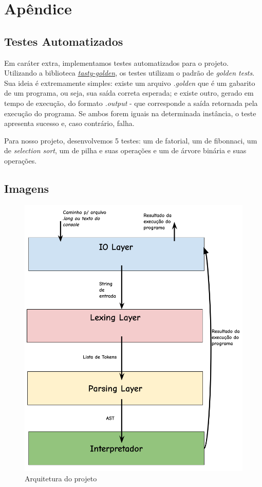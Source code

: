 \documentclass{article}
\begin{document}
\section{Apêndice}
\subsection{Testes Automatizados}
Em caráter extra, implementamos testes automatizados para o projeto. Utilizando a biblioteca \href{https://hackage.haskell.org/package/tasty-golden}{\textit{tasty-golden}}, os testes utilizam o padrão de \textit{golden tests}. Sua ideia é extremamente simples: existe um arquivo \textit{.golden} que é um gabarito de um programa, ou seja, sua saída correta esperada; e existe outro, gerado em tempo de execução, do formato \textit{.output} - que corresponde a saída retornada pela execução do programa. Se ambos forem iguais na determinada instância, o teste apresenta sucesso e, caso contrário, falha.

Para nosso projeto, desenvolvemos 5 testes: um de fatorial, um de fibonnaci, um de \textit{selection sort}, um de pilha e suas operações e um de árvore binária e suas operações.

\subsection{Imagens}
\begin{figure}[h]
\centering
\includegraphics[width=13cm]{architecture-compiladores.png}
\caption{Arquitetura do projeto}
\end{figure}

\newpage
\end{document}
